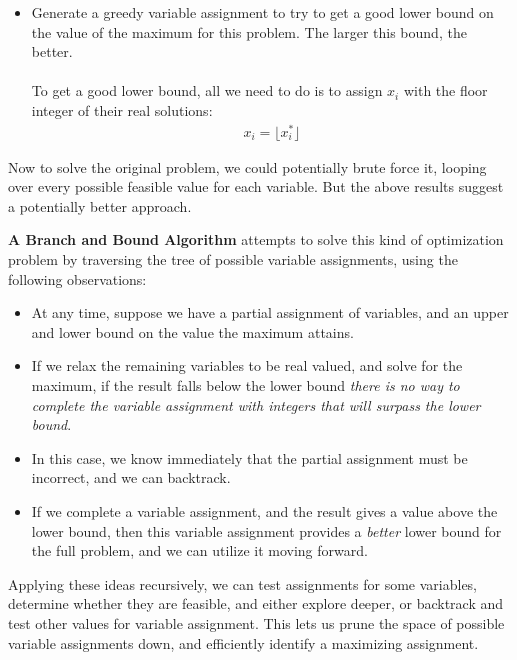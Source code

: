 \documentclass[11pt,letterpaper]{article}
\begin{document}
\begin{tcolorbox}
    \begin{itemize}
        \justifying
        \item Generate a greedy variable assignment to try to get a good lower bound on the value of the maximum for this problem. The larger this bound, the better. \\\\
        To get a good lower bound, all we need to do is to assign $x_i$ with the floor integer of their real solutions:
        \begin{align*}
            x_i = \lfloor x_i^\ast \rfloor
        \end{align*}
    \end{itemize}
\end{tcolorbox}
\begin{flushleft}
    \justifying
    Now to solve the original problem, we could potentially brute force it, looping over every possible feasible value for each variable. But the above results suggest a potentially better approach.
\end{flushleft}
\begin{flushleft}
    \justifying 
    \textbf{A Branch and Bound Algorithm} attempts to solve this kind of optimization problem by traversing the tree of possible variable assignments, using the following observations:
    \begin{itemize}
        \item At any time, suppose we have a partial assignment of variables, and an upper and lower bound on the value the maximum attains.
        \item If we relax the remaining variables to be real valued, and solve for the maximum, if the result falls below the lower bound \textit{there is no way to complete the variable assignment with integers that will surpass the lower bound}.
        \item In this case, we know immediately that the partial assignment must be incorrect, and we can backtrack.
        \item If we complete a variable assignment, and the result gives a value above the lower bound, then this variable assignment provides a \textit{better} lower bound for the full problem, and we can utilize it moving forward.
    \end{itemize}
\end{flushleft}
\begin{flushleft}
    \justifying
    Applying these ideas recursively, we can test assignments for some variables, determine whether they are feasible, and either explore deeper, or backtrack and test other values for variable assignment. This lets us prune the space of possible variable assignments down, and efficiently identify a maximizing assignment.
\end{flushleft}
\end{document}
